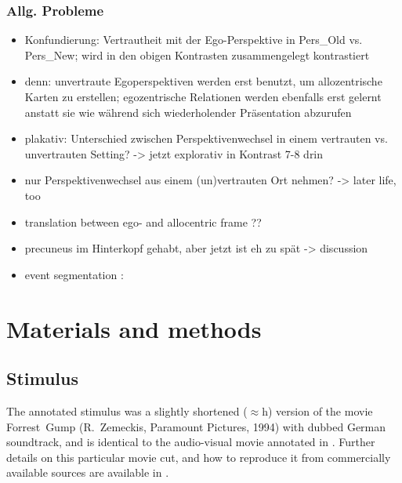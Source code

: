 \documentclass[10pt,a4paper,twocolumn]{article}
\begin{document}
\subsubsection{Allg. Probleme}
\begin{itemize}
	\item Konfundierung: Vertrautheit mit der Ego-Perspektive in Pers\_Old vs.
	Pers\_New; wird in den obigen Kontrasten zusammengelegt kontrastiert 
	\item denn: unvertraute Egoperspektiven werden erst benutzt, um allozentrische
	Karten zu erstellen; egozentrische Relationen werden ebenfalls erst
	gelernt anstatt sie wie während sich wiederholender Präsentation abzurufen 
	\item plakativ: Unterschied zwischen Perspektivenwechsel in einem vertrauten
	vs. unvertrauten Setting? -> jetzt explorativ in Kontrast 7-8 drin
	\item nur Perspektivenwechsel aus einem (un)vertrauten Ort nehmen? -> later
	life, too
	\item translation between ego- and allocentric frame ?? \citet{burgess_2002_human_hippocampus_spatial_episodic_memory_review}
	\item precuneus im Hinterkopf gehabt, aber jetzt ist eh zu spät -> discussion
	\item event segmentation \citep{zacks_2010_brains_cutting_room}: 
\end{itemize}




\section*{Materials and methods}

\subsection*{Stimulus}

The annotated stimulus was a slightly shortened ($\approx$\unit[2]{h}) version
of the movie Forrest~Gump (R.~Zemeckis, Paramount Pictures, 1994) with dubbed
German soundtrack, and is identical to the audio-visual movie annotated in
\cite{LRS+2015}. Further details on this particular movie cut, and how to
reproduce it from commercially available sources are available in
\cite{HAK+16}.
\end{document}
